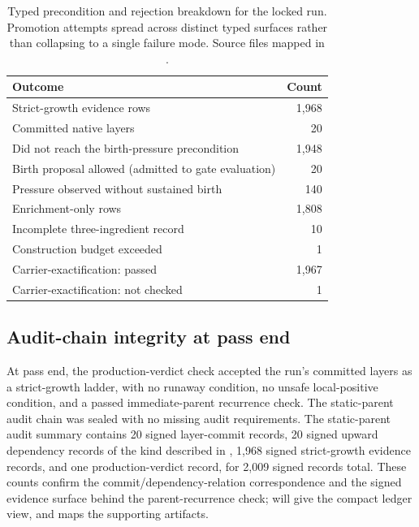 \documentclass{article}
\theoremstyle{definition}
\begin{document}
\begin{table}[t]
  \centering
  \small
  \caption{Typed precondition and rejection breakdown for the locked run. Promotion attempts spread across distinct typed surfaces rather than collapsing to a single failure mode. Source files mapped in .}
  \label{tab:precondition-and-rejections}
  \begin{tabularx}{\linewidth}{@{}>{\raggedright\arraybackslash}X r@{}}
    \toprule
    Outcome & Count \\
    \midrule
    Strict-growth evidence rows & 1{,}968 \\
    Committed native layers & 20 \\
    Did not reach the birth-pressure precondition & 1{,}948 \\
    Birth proposal allowed (admitted to gate evaluation) & 20 \\
    Pressure observed without sustained birth & 140 \\
    Enrichment-only rows & 1{,}808 \\
    Incomplete three-ingredient record & 10 \\
    Construction budget exceeded & 1 \\
    Carrier-exactification: passed & 1{,}967 \\
    Carrier-exactification: not checked & 1 \\
    \bottomrule
  \end{tabularx}
\end{table}
 
\subsection{Audit-chain integrity at pass end}\label{subsec:audit-integrity}

At pass end, the production-verdict check accepted the run's committed layers as a strict-growth ladder, with no runaway condition, no unsafe local-positive condition, and a passed immediate-parent recurrence check. The static-parent audit chain was sealed with no missing audit requirements. The static-parent audit summary contains 20 signed layer-commit records, 20 signed upward dependency records of the kind described in , 1,968 signed strict-growth evidence records, and one production-verdict record, for 2,009 signed records total. These counts confirm the commit/dependency-relation correspondence and the signed evidence surface behind the parent-recurrence check;  will give the compact ledger view, and  maps the supporting artifacts.
\end{document}
